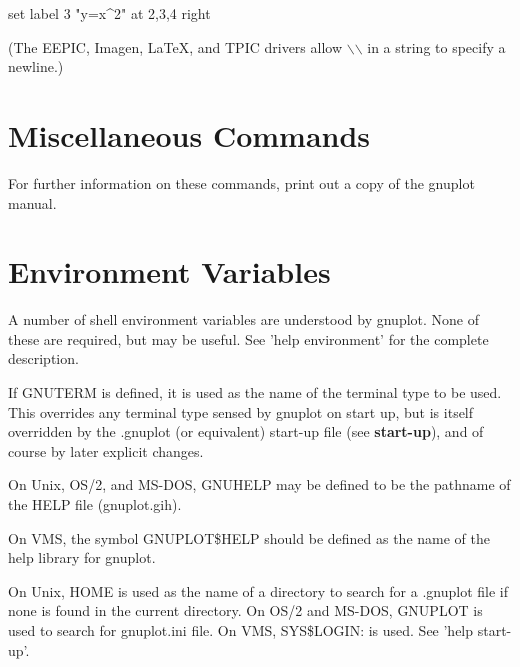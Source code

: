 {set label 3 "y=x^2" at 2,3,4 right}

(The EEPIC, Imagen, LaTeX, and TPIC drivers allow $\backslash$$\backslash$
in a string to specify a newline.)

\section{Miscellaneous Commands}

For further information on these commands, print out a copy
of the gnuplot manual.


\section{Environment Variables}

A number of shell environment variables are understood by gnuplot.
None of these are required, but may be useful.
See 'help environment' for the complete description.

If GNUTERM is defined, it is used as the name of the terminal type to
be used. This overrides any terminal type sensed by gnuplot on start
up, but is itself overridden by the .gnuplot (or equivalent) start-up
file (see {\bf start-up}), and of course by later explicit changes.

On Unix, OS/2, and MS-DOS, GNUHELP may be defined to be the pathname
of the HELP file (gnuplot.gih).

On VMS, the symbol GNUPLOT\$HELP should be defined as the name of
the help library for gnuplot.

On Unix, HOME is used as the name of a directory to search for
a .gnuplot file if none is found in the current directory.
On OS/2 and MS-DOS, GNUPLOT is used to search for gnuplot.ini file.
On VMS, SYS\$LOGIN: is used. See 'help start-up'.

